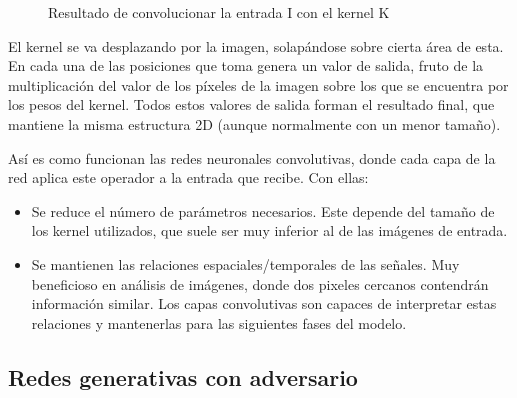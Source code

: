\begin{figure}[H]
\centering
    \caption{Resultado de convolucionar la entrada I con el kernel K \cite{Goodfellow-et-al-2016}}
\end{figure}

El kernel se va desplazando por la imagen, solapándose sobre cierta área de esta. En cada una de las posiciones que toma genera un valor de salida, fruto de la multiplicación del valor de los píxeles de la imagen sobre los que se encuentra por los pesos del kernel. Todos estos valores de salida forman el resultado final, que mantiene la misma estructura 2D (aunque normalmente con un menor tamaño). 

Así es como funcionan las redes neuronales convolutivas, donde cada capa de la red aplica este operador a la entrada que recibe. Con ellas:
\begin{itemize}
    \item Se reduce el número de parámetros necesarios. Este depende del tamaño de los kernel utilizados, que suele ser muy inferior al de las imágenes de entrada.
    \item Se mantienen las relaciones espaciales/temporales de las señales. Muy beneficioso en análisis de imágenes, donde dos pixeles cercanos contendrán información similar. Los capas convolutivas son capaces de interpretar estas relaciones y mantenerlas para las siguientes fases del modelo.
\end{itemize}


\subsection{Redes generativas con adversario}

